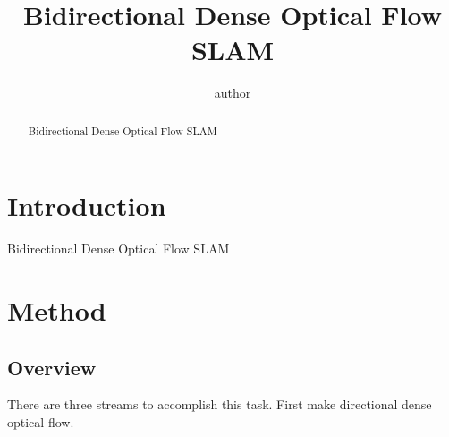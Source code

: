 \documentclass{article}
\title { Bidirectional Dense Optical Flow SLAM }
\author{author}
\begin{document}
\maketitle


\begin{abstract}
Bidirectional Dense Optical Flow SLAM
\end{abstract}

\section{Introduction}
Bidirectional Dense Optical Flow SLAM

\section{Method}
\subsection{Overview}
There are three streams to accomplish this task. First make directional dense optical flow.
\end{document}
